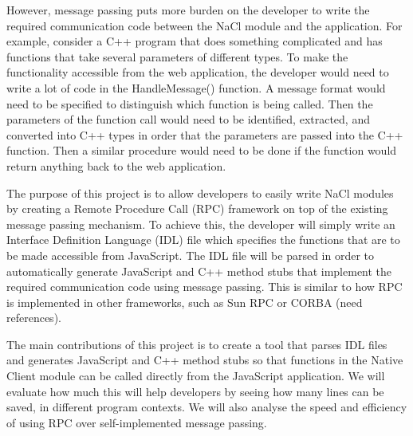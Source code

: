 However, message passing puts more burden on the developer to write the required communication code between the NaCl module and the application. For example, consider a C++ program that does something complicated and has functions that take several parameters of different types. To make the functionality accessible from the web application, the developer would need to write a lot of code in the HandleMessage() function. A message format would need to be specified to distinguish which function is being called. Then the parameters of the function call would need to be identified, extracted, and converted into C++ types in order that the parameters are passed into the C++ function. Then a similar procedure would need to be done if the function would return anything back to the web application. 

The purpose of this project is to allow developers to easily write NaCl modules by creating a Remote Procedure Call (RPC) framework on top of the existing message passing mechanism. To achieve this, the developer will simply write an Interface Definition Language (IDL) file which specifies the functions that are to be made accessible from JavaScript. The IDL file will be parsed in order to automatically generate JavaScript and C++ method stubs that implement the required communication code using message passing. This is similar to how RPC is implemented in other frameworks, such as Sun RPC or CORBA (need references).

The main contributions of this project is to create a tool that parses IDL files and generates JavaScript and C++ method stubs so that functions in the Native Client module can be called directly from the JavaScript application. We will evaluate how much this will help developers by seeing how many lines can be saved, in different program contexts. We will also analyse the speed and efficiency of using RPC over self-implemented message passing. 